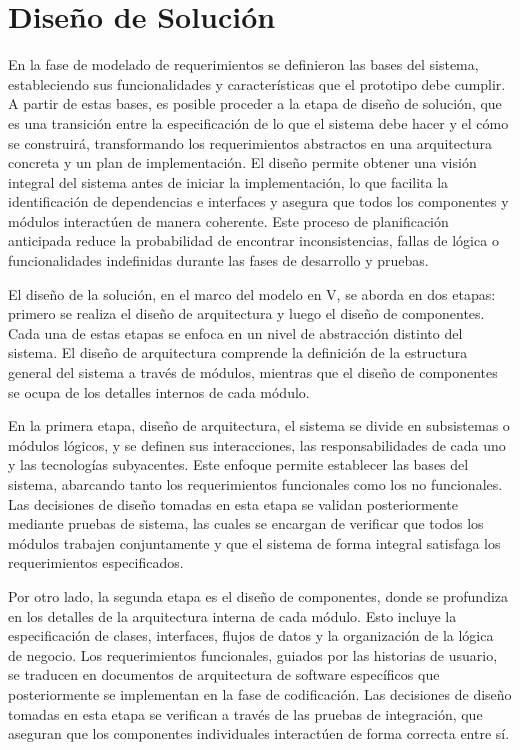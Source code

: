 \chapter[Diseño de Solución]{Diseño de Solución}
\label{cp:design}

\parindent0pt

En la fase de modelado de requerimientos se definieron las bases del sistema, estableciendo sus funcionalidades y características que el prototipo debe cumplir. A partir de estas bases, es posible proceder a la etapa de diseño de solución, que es una transición entre la especificación de lo que el sistema debe hacer y el cómo se construirá, transformando los requerimientos abstractos en una arquitectura concreta y un plan de implementación. El diseño permite obtener una visión integral del sistema antes de iniciar la implementación, lo que facilita la identificación de dependencias e interfaces y asegura que todos los componentes y módulos interactúen de manera coherente. Este proceso de planificación anticipada reduce la probabilidad de encontrar inconsistencias, fallas de lógica o funcionalidades indefinidas durante las fases de desarrollo y pruebas.

El diseño de la solución, en el marco del modelo en V, se aborda en dos etapas: primero se realiza el diseño de arquitectura y luego el diseño de componentes. Cada una de estas etapas se enfoca en un nivel de abstracción distinto del sistema. El diseño de arquitectura comprende la definición de la estructura general del sistema a través de módulos, mientras que el diseño de componentes se ocupa de los detalles internos de cada módulo.

En la primera etapa, diseño de arquitectura, el sistema se divide en subsistemas o módulos lógicos, y se definen sus interacciones, las responsabilidades de cada uno y las tecnologías subyacentes. Este enfoque permite establecer las bases del sistema, abarcando tanto los requerimientos funcionales como los no funcionales. Las decisiones de diseño tomadas en esta etapa se validan posteriormente mediante pruebas de sistema, las cuales se encargan de verificar que todos los módulos trabajen conjuntamente y que el sistema de forma integral satisfaga los requerimientos especificados.

Por otro lado, la segunda etapa es el diseño de componentes, donde se profundiza en los detalles de la arquitectura interna de cada módulo. Esto incluye la especificación de clases, interfaces, flujos de datos y la organización de la lógica de negocio. Los requerimientos funcionales, guiados por las historias de usuario, se traducen en documentos de arquitectura de software específicos que posteriormente se implementan en la fase de codificación. Las decisiones de diseño tomadas en esta etapa se verifican a través de las pruebas de integración, que aseguran que los componentes individuales interactúen de forma correcta entre sí.

